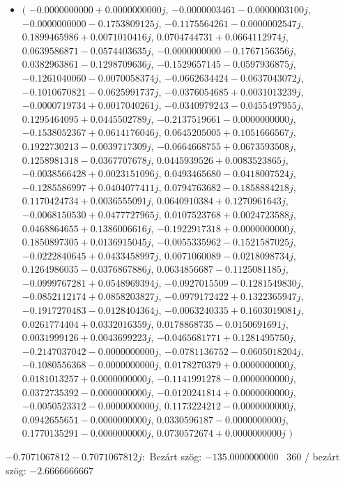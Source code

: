 \documentclass[14pt,a4paper]{article}
\begin{document}
\begin{itemize}
\item
$\big($
$-0.0000000000+0.0000000000j$, $-0.0000003461-0.0000003100j$, $-0.0000000000-0.1753809125j$, $-0.1175564261-0.0000002547j$, $0.1899465986+0.0071010416j$, $0.0704744731+0.0664112974j$, $0.0639586871-0.0574403635j$, $-0.0000000000-0.1767156356j$, $0.0382963861-0.1298709636j$, $-0.1529657145-0.0597936875j$, $-0.1261040060-0.0070058374j$, $-0.0662634424-0.0637043072j$, $-0.1010670821-0.0625991737j$, $-0.0376054685+0.0031013239j$, $-0.0000719734+0.0017040261j$, $-0.0340979243-0.0455497955j$, $0.1295464095+0.0445502789j$, $-0.2137519661-0.0000000000j$, $-0.1538052367+0.0614176046j$, $0.0645205005+0.1051666567j$, $0.1922730213-0.0039717309j$, $-0.0664668755+0.0673593508j$, $0.1258981318-0.0367707678j$, $0.0445939526+0.0083523865j$, $-0.0038566428+0.0023151096j$, $0.0493465680-0.0418007524j$, $-0.1285586997+0.0404077411j$, $0.0794763682-0.1858884218j$, $0.1170424734+0.0036555091j$, $0.0640910384+0.1270961643j$, $-0.0068150530+0.0477727965j$, $0.0107523768+0.0024723588j$, $0.0468864655+0.1386006616j$, $-0.1922917318+0.0000000000j$, $0.1850897305+0.0136915045j$, $-0.0055335962-0.1521587025j$, $-0.0222840645+0.0433458997j$, $0.0071060089-0.0218098734j$, $0.1264986035-0.0376867886j$, $0.0634856687-0.1125081185j$, $-0.0999767281+0.0548969394j$, $-0.0927015509-0.1281549830j$, $-0.0852112174+0.0858203827j$, $-0.0979172422+0.1322365947j$, $-0.1917270483-0.0128404364j$, $-0.0063240335+0.1603019081j$, $0.0261774404+0.0332016359j$, $0.0178868735-0.0150691691j$, $0.0031999126+0.0043699223j$, $-0.0465681771+0.1281495750j$, $-0.2147037042-0.0000000000j$, $-0.0781136752-0.0605018204j$, $-0.1080556368-0.0000000000j$, $0.0178270379+0.0000000000j$, $0.0181013257+0.0000000000j$, $-0.1141991278-0.0000000000j$, $0.0372735392-0.0000000000j$, $-0.0120241814+0.0000000000j$, $-0.0050523312-0.0000000000j$, $0.1173224212-0.0000000000j$, $0.0942655651-0.0000000000j$, $0.0330596187-0.0000000000j$, $0.1770135291-0.0000000000j$, $0.0730572674+0.0000000000j$
$\big)$
\end{itemize}
$-0.7071067812-0.7071067812j$:\
Bezárt szög: $-135.0000000000$ \
360 / bezárt szög: $-2.6666666667$\
\end{document}
